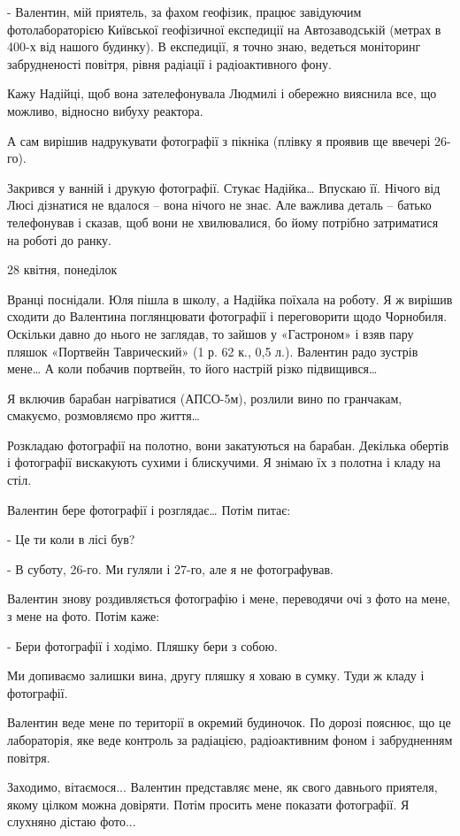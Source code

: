 - Валентин, мій приятель, за фахом геофізик, працює завідуючим фотолабораторією
Київської геофізичної експедиції на Автозаводській (метрах в 400-х від нашого
будинку). В експедиції, я точно знаю, ведеться моніторинг забрудненості
повітря, рівня радіації і радіоактивного фону.

Кажу Надійці, щоб вона зателефонувала Людмилі і обережно вияснила все, що
можливо, відносно вибуху реактора. 

А сам вирішив надрукувати фотографії з пікніка (плівку я проявив ще ввечері
26-го).

Закрився у ванній і друкую фотографії. Стукає Надійка… Впускаю її. Нічого від
Люсі дізнатися не вдалося – вона нічого не знає. Але важлива деталь – батько
телефонував і сказав, щоб вони не хвилювалися, бо йому потрібно затриматися на
роботі до ранку. 

28 квітня, понеділок 

Вранці поснідали. Юля пішла в школу, а Надійка поїхала на роботу. Я ж вирішив
сходити до Валентина поглянцювати фотографії і переговорити щодо Чорнобиля.
Оскільки давно до нього не заглядав, то зайшов у «Гастроном» і взяв пару пляшок
«Портвейн Таврический» (1 р. 62 к., 0,5 л.). Валентин радо зустрів мене… А коли
побачив портвейн, то його настрій різко підвищився… 

Я включив барабан нагріватися (АПСО-5м), розлили вино по гранчакам, смакуємо,
розмовляємо про життя… 

Розкладаю фотографії на полотно, вони закатуються на барабан. Декілька обертів
і фотографії вискакують сухими і блискучими. Я знімаю їх з полотна і кладу на
стіл. 

Валентин бере фотографії і розглядає… Потім питає: 

- Це ти коли в лісі був?

- В суботу, 26-го. Ми гуляли і 27-го, але я не фотографував.

Валентин знову роздивляється фотографію і мене, переводячи очі з фото на мене,
з мене на фото. Потім каже:

- Бери фотографії і ходімо. Пляшку бери з собою.

Ми допиваємо залишки вина, другу пляшку я ховаю в сумку. Туди ж кладу і
фотографії. 

Валентин веде мене по території в окремий будиночок. По дорозі пояснює, що це
лабораторія, яке веде контроль за радіацією, радіоактивним фоном і забрудненням
повітря. 

Заходимо, вітаємося... Валентин представляє мене, як свого давнього приятеля,
якому цілком можна довіряти. Потім просить мене показати фотографії. Я слухняно
дістаю фото... 

